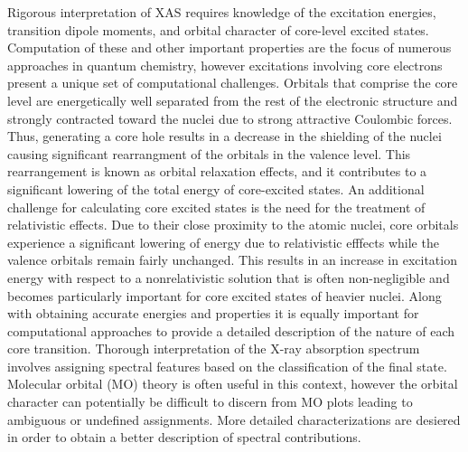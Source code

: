 \documentclass{article}
\begin{document}
Rigorous interpretation of XAS requires knowledge of the excitation energies, transition dipole moments, and orbital character of core-level excited states. Computation of these and other important properties are the focus of numerous approaches in quantum chemistry, however excitations involving core electrons present a unique set of computational challenges. Orbitals that comprise the core level are energetically well separated from the rest of the electronic structure and strongly contracted toward the nuclei due to strong attractive Coulombic forces. Thus, generating a core hole results in a decrease in the shielding of the nuclei\cite{snyder_coreelectron_1971} causing significant rearrangment of the orbitals in the valence level.\cite{schirmer_core_1996} This rearrangement is known as orbital relaxation effects, and it contributes to a significant lowering of the total energy of core-excited states.\cite{decleva_molecular_1994}  An additional challenge for calculating core excited states is the need for the treatment of relativistic effects.\cite{rehr_theoretical_2000,ankudinov_relativistic_1997} Due to their close proximity to the atomic nuclei, core orbitals experience a significant lowering of energy due to relativistic efffects while the valence orbitals remain fairly unchanged. This results in an increase in excitation energy with respect to a nonrelativistic solution that is often non-negligible and becomes particularly important for core excited states of heavier nuclei.\cite{kutzler_use_1980} Along with obtaining accurate energies and properties it is equally important for computational approaches to provide a detailed description of the nature of each core transition.\cite{bagus_identification_1996,glaser_ligand_2000,urquhart_trends_2002} Thorough interpretation of the X-ray absorption spectrum involves assigning spectral features based on the classification of the final state. Molecular orbital (MO) theory is often useful in this context, however the orbital character can potentially be difficult to discern from MO plots leading to ambiguous or undefined assignments. \cite{behyan_sulfur_2011,behyan_sulfur_2013,behyan_chemical_2014} More detailed characterizations are desiered in order to obtain a better description of spectral contributions. 
\end{document}

